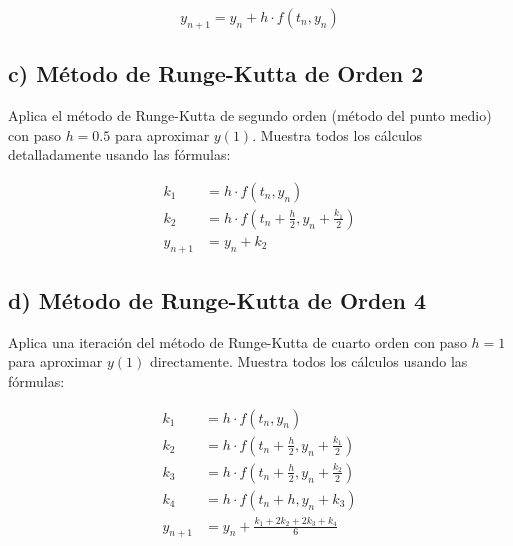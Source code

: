 \documentclass[12pt,a4paper]{article}
\begin{document}
$$y_{n+1} = y_n + h \cdot f(t_n, y_n)$$

\subsection*{c) Método de Runge-Kutta de Orden 2}
Aplica el método de Runge-Kutta de segundo orden (método del punto medio) con paso $h = 0.5$ para aproximar $y(1)$. Muestra todos los cálculos detalladamente usando las fórmulas:

\begin{align}
k_1 &= h \cdot f(t_n, y_n) \\
k_2 &= h \cdot f\left(t_n + \frac{h}{2}, y_n + \frac{k_1}{2}\right) \\
y_{n+1} &= y_n + k_2
\end{align}

\subsection*{d) Método de Runge-Kutta de Orden 4}
Aplica una iteración del método de Runge-Kutta de cuarto orden con paso $h = 1$ para aproximar $y(1)$ directamente. Muestra todos los cálculos usando las fórmulas:

\begin{align}
k_1 &= h \cdot f(t_n, y_n) \\
k_2 &= h \cdot f\left(t_n + \frac{h}{2}, y_n + \frac{k_1}{2}\right) \\
k_3 &= h \cdot f\left(t_n + \frac{h}{2}, y_n + \frac{k_2}{2}\right) \\
k_4 &= h \cdot f(t_n + h, y_n + k_3) \\
y_{n+1} &= y_n + \frac{k_1 + 2k_2 + 2k_3 + k_4}{6}
\end{align}
\end{document}
